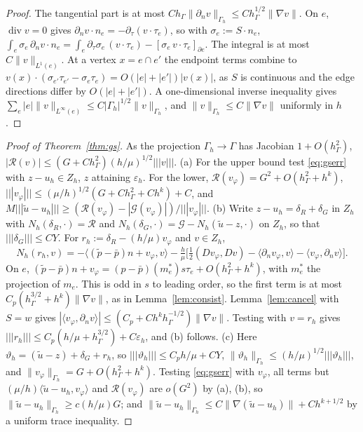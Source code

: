 \documentclass[5p,times]{elsarticle}
\theoremstyle{definition}
\newcommand{\hG}{h_\Gamma}
\newcommand{\Gh}{\Gamma_h}
\newcommand{\Zh}{Z_h}
\newcommand{\dn}{\partial_n}
\newcommand{\ut}{\tilde u}
\newcommand{\pt}{\tilde p}
\newcommand{\pbar}{\bar p}
\newcommand{\ip}[2]{\langle #1,#2\rangle}
\newcommand{\tnorm}[1]{|\!|\!|#1|\!|\!|}
\newcommand{\norm}[1]{\lVert #1\rVert}
\newcommand{\eps}{\varepsilon_h}
\newcommand{\Gc}{\mathcal G}
\newcommand{\Rc}{\mathcal R}
\renewcommand{\div}{\operatorname{div}}
\newcommand{\ext}[1]{\cite[#1]{PadhiExt}}
\begin{document}
\begin{proof}
The tangential part is at most $C\hG\norm{\dn v}_{\Gh}\le C\hG^{1/2}\norm{\nabla v}$. On $e$, $\div v=0$ gives $\dn v\cdot n_e=-\partial_\tau(v\cdot\tau_e)$, so with $\sigma_e:=S\cdot n_e$,
$\int_e\sigma_e\,\dn v\cdot n_e=\int_e\partial_\tau\sigma_e\,(v\cdot\tau_e)-[\sigma_e\,v\cdot\tau_e]_{\partial e}$.
The integral is at most $C\norm v_{L^1(e)}$. At a vertex $x=e\cap e'$ the endpoint terms combine to $v(x)\cdot(\sigma_{e'}\tau_{e'}-\sigma_e\tau_e)=O(|e|+|e'|)|v(x)|$, as $S$ is continuous and the edge directions differ by $O(|e|+|e'|)$. A one-dimensional inverse inequality gives $\sum_e|e|\norm v_{L^\infty(e)}\le C|\Gh|^{1/2}\norm v_{\Gh}$, and $\norm v_{\Gh}\le C\norm{\nabla v}$ uniformly in $h$ \ext{Lemma~3.2}.
\end{proof}

\begin{proof}[Proof of Theorem~\ref{thm:gs}]
As the projection $\Gh\to\Gamma$ has Jacobian $1+O(\hG^2)$, $|\Rc(v)|\le(G+C\hG^2)(h/\mu)^{1/2}\tnorm v$. (a) For the upper bound test \eqref{eq:gserr} with $z-u_h\in\Zh$, $z$ attaining $\eps$. For the lower, $\Rc(v_\varphi)=G^2+O(\hG^2+h^k)$, $\tnorm{v_\varphi}\le(\mu/h)^{1/2}(G+C\hG^2+Ch^k)+C$, and $M\tnorm{\ut-u_h}\ge(\Rc(v_\varphi)-|\Gc(v_\varphi)|)/\tnorm{v_\varphi}$.
(b) Write $z-u_h=\delta_R+\delta_G$ in $\Zh$ with $N_h(\delta_R,\cdot)=\Rc$ and $N_h(\delta_G,\cdot)=\Gc-N_h(\ut-z,\cdot)$ on $\Zh$, so that $\tnorm{\delta_G}\le CY$. For $r_h:=\delta_R-(h/\mu)v_\varphi$ and $v\in\Zh$,
\[
N_h(r_h,v)=-\ip{(\pt-\pbar)n+v_\varphi}{v}-\tfrac h\mu\bigl[\tfrac12(Dv_\varphi,Dv)-\ip{\dn v_\varphi}{v}-\ip{v_\varphi}{\dn v}\bigr].
\]
On $e$, $(\pt-\pbar)n+v_\varphi=(p-\pbar)(m_e^\ast)s\tau_e+O(\hG^2+h^k)$, with $m_e^\ast$ the projection of $m_e$. This is odd in $s$ to leading order, so the first term is at most $C_p(\hG^{3/2}+h^k)\norm{\nabla v}$, as in Lemma~\ref{lem:consist}. Lemma~\ref{lem:cancel} with $S=w$ gives $|\ip{v_\varphi}{\dn v}|\le(C_p+Ch^k\hG^{-1/2})\norm{\nabla v}$. Testing with $v=r_h$ gives $\tnorm{r_h}\le C_p(h/\mu+\hG^{3/2})+C\eps$, and (b) follows.
(c) Here $\vartheta_h=(\ut-z)+\delta_G+r_h$, so $\tnorm{\vartheta_h}\le C_ph/\mu+CY$, $\norm{\vartheta_h}_{\Gh}\le(h/\mu)^{1/2}\tnorm{\vartheta_h}$, and $\norm{v_\varphi}_{\Gh}=G+O(\hG^2+h^k)$. Testing \eqref{eq:gserr} with $v_\varphi$, all terms but $(\mu/h)\ip{\ut-u_h}{v_\varphi}$ and $\Rc(v_\varphi)$ are $o(G^2)$ by (a), (b), so $\norm{\ut-u_h}_{\Gh}\ge c(h/\mu)G$; and $\norm{\ut-u_h}_{\Gh}\le C\norm{\nabla(\ut-u_h)}+Ch^{k+1/2}$ by a uniform trace inequality.
\end{proof}
\end{document}
